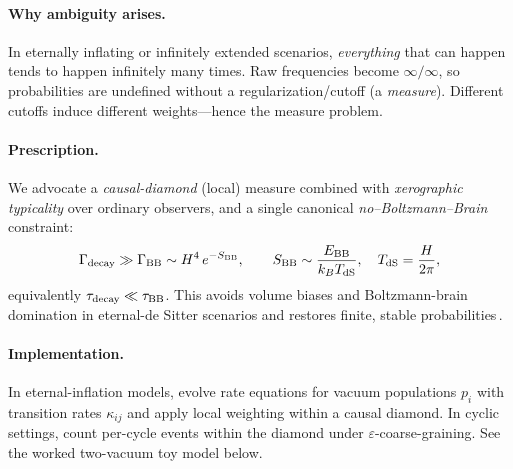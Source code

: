 \documentclass[12pt]{article}
\theoremstyle{remark}
\begin{document}
\paragraph{Why ambiguity arises.} In eternally inflating or infinitely extended scenarios, \emph{everything} that can happen tends to happen infinitely many times. Raw frequencies become $\infty/\infty$, so probabilities are undefined without a regularization/cutoff (a \emph{measure}). Different cutoffs induce different weights---hence the measure problem.

\paragraph{Prescription.} We advocate a \emph{causal-diamond} (local) measure combined with \emph{xerographic typicality} over ordinary observers, and a single canonical \emph{no--Boltzmann--Brain} constraint:
\begin{equation}
 \Gamma_{\rm decay} \gg \Gamma_{\rm BB} \sim H^4\,e^{-S_{\rm BB}},\qquad 
 S_{\rm BB}\sim \frac{E_{\rm BB}}{k_B T_{\rm dS}},\quad T_{\rm dS}=\frac{H}{2\pi},
\end{equation}
equivalently $\tau_{\rm decay}\ll \tau_{\rm BB}$. This avoids volume biases and Boltzmann-brain domination in eternal-de Sitter scenarios and restores finite, stable probabilities\,\cite{DysonKlebanSusskind2002,Page2007}.

\paragraph{Implementation.} In eternal-inflation models, evolve rate equations for vacuum populations $p_i$ with transition rates $\kappa_{ij}$ and apply local weighting within a causal diamond. In cyclic settings, count per-cycle events within the diamond under $\varepsilon$-coarse-graining. See the worked two-vacuum toy model below.
\end{document}
